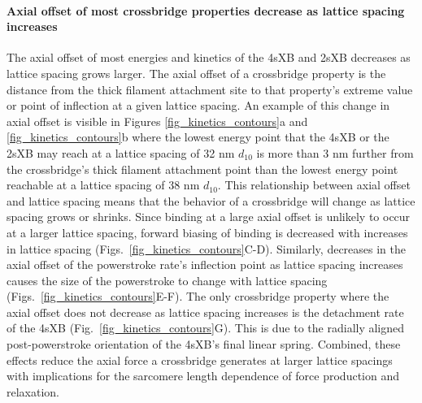 \documentclass[]{article}
\begin{document}
\paragraph{Axial offset of most crossbridge properties decrease as lattice spacing increases} %
The axial offset of most energies and kinetics of the 4sXB and 2sXB decreases as lattice spacing grows larger.
The axial offset of a crossbridge property is the distance from the thick filament attachment site to that property's extreme value or point of inflection at a given lattice spacing. 
An example of this change in axial offset is visible in Figures \ref{fig_kinetics_contours}a and \ref{fig_kinetics_contours}b where the lowest energy point that the 4sXB or the 2sXB may reach at a lattice spacing of 32 nm $d_{10}$ is more than 3 nm further from the crossbridge's thick filament attachment point than the lowest energy point reachable at a lattice spacing of 38 nm $d_{10}$.
This relationship between axial offset and lattice spacing means that the behavior of a crossbridge will change as lattice spacing grows or shrinks.
Since binding at a large axial offset is unlikely to occur at a larger lattice spacing, forward biasing of binding is decreased with increases in lattice spacing (Figs.~\ref{fig_kinetics_contours}C-D). 
Similarly, decreases in the axial offset of the powerstroke rate's inflection point as lattice spacing increases causes the size of the powerstroke to change with lattice spacing (Figs.~\ref{fig_kinetics_contours}E-F).
The only crossbridge property where the axial offset does not decrease as lattice spacing increases is the detachment rate of the 4sXB (Fig.~\ref{fig_kinetics_contours}G).
This is due to the radially aligned post-powerstroke orientation of the 4sXB's final linear spring. 
Combined, these effects reduce the axial force a crossbridge generates at larger lattice spacings with implications for the sarcomere length dependence of force production and relaxation. 
\end{document}
